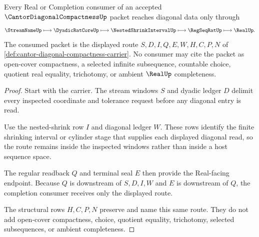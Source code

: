 \begin{theorem}
\label{thm:cantor-diagonal-compactness-real-completion-route}
Every Real or Completion consumer of an accepted $\CantorDiagonalCompactnessUp$ packet reaches diagonal data only through
$$
\StreamNameUp \longmapsto \DyadicRatCoreUp \longmapsto \NestedShrinkIntervalUp \longmapsto \RegSeqRatUp \longmapsto \RealUp .
$$
The consumed packet is the displayed route $S,D,I,Q,E,W,H,C,P,N$ of \autoref{def:cantor-diagonal-compactness-carrier}. No consumer may cite the packet as open-cover compactness, a selected infinite subsequence, countable choice, quotient real equality, trichotomy, or ambient $\RealUp$ completeness.
\end{theorem}
\begin{proof}
Start with the carrier. The stream windows $S$ and dyadic ledger $D$ delimit every inspected coordinate and tolerance request before any diagonal entry is read.

Use the nested-shrink row $I$ and diagonal ledger $W$. These rows identify the finite shrinking interval or cylinder stage that supplies each displayed diagonal read, so the route remains inside the inspected windows rather than inside a host sequence space.

The regular readback $Q$ and terminal seal $E$ then provide the Real-facing endpoint. Because $Q$ is downstream of $S,D,I,W$ and $E$ is downstream of $Q$, the completion consumer receives only the displayed route.

The structural rows $H,C,P,N$ preserve and name this same route. They do not add open-cover compactness, choice, quotient equality, trichotomy, selected subsequences, or ambient completeness.
\end{proof}



